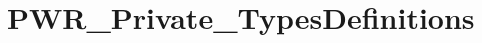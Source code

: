 \hypertarget{group___p_w_r___private___types_definitions}{\section{P\-W\-R\-\_\-\-Private\-\_\-\-Types\-Definitions}
\label{group___p_w_r___private___types_definitions}
}
